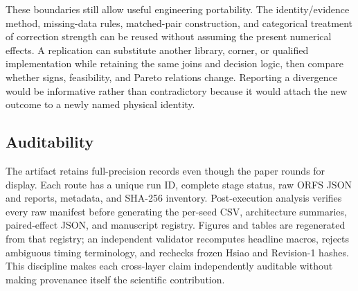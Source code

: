 These boundaries still allow useful engineering portability. The identity/evidence method, missing-data rules, matched-pair construction, and categorical treatment of correction strength can be reused without assuming the present numerical effects. A replication can substitute another library, corner, or qualified implementation while retaining the same joins and decision logic, then compare whether signs, feasibility, and Pareto relations change. Reporting a divergence would be informative rather than contradictory because it would attach the new outcome to a newly named physical identity.

\subsection{Auditability}

The artifact retains full-precision records even though the paper rounds for display. Each route has a unique run ID, complete stage status, raw ORFS JSON and reports, metadata, and SHA-256 inventory. Post-execution analysis verifies every raw manifest before generating the per-seed CSV, architecture summaries, paired-effect JSON, and manuscript registry. Figures and tables are regenerated from that registry; an independent validator recomputes headline macros, rejects ambiguous timing terminology, and rechecks frozen Hsiao and Revision-1 hashes. This discipline makes each cross-layer claim independently auditable without making provenance itself the scientific contribution.
